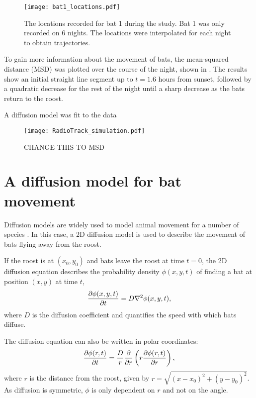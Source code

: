 \begin{figure} [h]
    \centering
        \texttt{[image: bat1\_locations.pdf]}
        \caption{The locations recorded for bat 1 during the study. Bat 1 was only recorded on 6 nights. The locations were interpolated for each night to obtain trajectories.}
    \label{fig:bat1}
\end{figure}

To gain more information about the movement of bats, the mean-squared distance (MSD) was plotted over the course of the night, shown in . The results show an initial straight line segment up to $t = 1.6$ hours from sunset, followed by a quadratic decrease for the rest of the night until a sharp decrease as the bats return to the roost.

A diffusion model was fit to the data


\begin{figure} [h]
    \centering
        \texttt{[image: RadioTrack\_simulation.pdf]}
        \caption{CHANGE THIS TO MSD}
    \label{fig:radiotrack_fit}
\end{figure}


\section{A diffusion model for bat movement}

Diffusion models are widely used to model animal movement for a number of species \cite{Ovaskainen2016}. In this case, a 2D diffusion model is used to describe the movement of bats flying away from the roost.

If the roost is at $(x_0,y_0)$ and bats leave the roost at time $t =0$,
the 2D diffusion equation describes the probability density $\phi(x,y,t)$ of
finding a bat at position $(x,y)$ at time $t$,
%
\begin{equation}
  \frac{\partial \phi(x,y,t)}{\partial  t} = D \nabla^2 \phi(x,y,t) ,
  \label{eqn:diffusion_cartesian}
\end{equation}
%
where $D$ is the diffusion coefficient and quantifies the speed with which bats diffuse.

The diffusion equation can also be written in polar coordinates:
%
\begin{equation}
\frac{\partial  \phi(r,t)}{\partial t} = \frac{D}{r} \frac{\partial }{\partial  r} \left( r \frac{\partial \phi(r,t)}{\partial r} \right),
\label{eqn:diffusion_polar}
\end{equation}
%
where $r$ is the distance from the roost, given by $r=\sqrt{(x-x_0)^2 + (y-y_0)^2}$. As diffusion is symmetric, $\phi$ is only dependent on $r$ and not on the angle.

